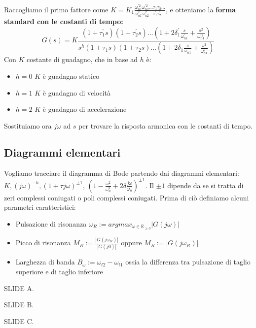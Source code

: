\documentclass[11pt]{article}
\begin{document}
Raccogliamo il primo fattore come $K=K_1\frac{\omega^{'2}_{n1}\omega^{'2}_{n2}...\tau_1\tau_2...}{\omega^{2}_{n1}\omega^{2}_{n2}...\tau_1^{'}\tau_2^{'}...} $, e otteniamo la \textbf{forma standard con le costanti di tempo:}
\begin{displaymath}
    G(s)=K\frac{(1+\tau_1^{'}s)(1+\tau_2^{'}s)\dots\left(1+2\delta^{'}_1 \frac{s}{\omega^{'}_{n1}}+\frac{s^2}{\omega^{'2}_{n1}}\right)}{s^h(1+\tau_1s)(1+\tau_2s)\dots\left(1+2\delta_1 \frac{s}{\omega_{n1}}+\frac{s^2}{\omega^{2}_{n1}}\right)}
\end{displaymath}
Con $K$ costante di guadagno, che in base ad $h$ è:
\begin{itemize}
    \item $h=0$ $K$ è guadagno statico
    \item $h=1$ $K$ è guadagno di velocità
    \item $h=2$ $K$ è guadagno di accelerazione
\end{itemize}
Sostituiamo ora $j\omega$ ad $s$ per trovare la risposta armonica con le costanti di tempo.
\subsection{Diagrammi elementari}
Vogliamo tracciare il diagramma di Bode partendo dai diagrammi elementari: $K, (j\omega)^{-h}, (1+\tau j \omega)^{\pm 1}$, $\left(1-\frac{\omega^2}{\omega^2_n}+2\delta \frac{j\omega}{\omega_n}\right)^{\pm1}$. Il $\pm1$ dipende da se si tratta di zeri complessi coniugati o poli complessi coniugati.
Prima di ciò definiamo alcuni parametri caratteristici:
\begin{itemize}
    \item Pulsazione di risonanza $\omega_R := arg max_{\omega \in \mathbb{R}_{\ge0}}|G(j\omega)|$
    \item Picco di risonanza $M_R := \frac{|G(j\omega_R)|}{|G(j0)|}$ oppure $M_R := |G(j\omega_R)|$
    \item Larghezza di banda $B_\omega := \omega_{t2} - \omega_{t1}$ ossia la differenza tra pulsazione di taglio superiore e di taglio inferiore
\end{itemize}
SLIDE A.

SLIDE B.

SLIDE C.
\end{document}
